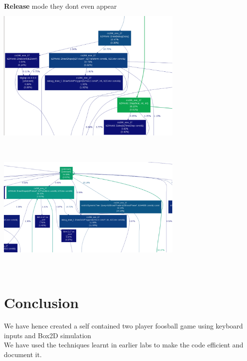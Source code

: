 \documentclass{article}
\begin{document}
\begin{enumerate}
\textbf{Release} mode they dont even appear\\
\includegraphics[width=260pt,height=200pt]{debug1} \hfill
\includegraphics[width=260pt,height=200pt]{release1}\\
\end{enumerate}
\section{Conclusion}
We have hence created a self contained two player foosball game using keyboard inputs and Box2D simulation\\
We have used the techniques learnt in earlier labs to make the code efficient and document it. \\



\end{document}
